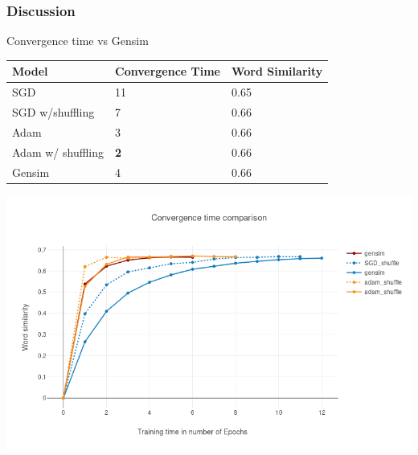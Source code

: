 \begin{frame}
\frametitle{Discussion}
Convergence time vs Gensim 
    \begin{table}[]
\begin{tabular}{|l|l|l|}
\hline
Model    & Convergence Time & Word Similarity \\ \hline
SGD & {11}              & 0.65            \\ \hline
SGD w/shuffling & {7}              & 0.66            \\ \hline
Adam & {3}              & 0.66            \\ \hline
Adam w/ shuffling & \textbf{2}              & 0.66      \\ \hline
Gensim   & 4          & 0.66            \\ \hline
\end{tabular}
\end{table}
\includegraphics[scale=0.3]{images/gensim_vs_adam}
  \end{frame}